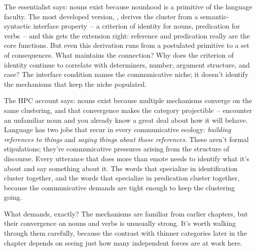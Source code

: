 The essentialist says: nouns exist because nounhood is a primitive of the language faculty. The most developed version, \textcite{baker2003}, derives the cluster from a semantic-syntactic interface property~-- a criterion of identity for nouns, predication for verbs~-- and this gets the extension right: reference and predication really are the core functions. But even this derivation runs from a postulated primitive to a set of consequences. What maintains the connection? Why does the criterion of identity continue to correlate with determiners, number, argument structure, and case? The interface condition names the communicative niche; it doesn't identify the mechanisms that keep the niche populated.

The HPC account says: nouns exist because multiple mechanisms converge on the same clustering, and that convergence makes the category projectible~-- encounter an unfamiliar noun and you already know a great deal about how it will behave. Language has two jobs that recur in every communicative ecology: \emph{building references to things} and \emph{saying things about those references}. These aren't formal stipulations; they're communicative pressures arising from the structure of discourse. Every utterance that does more than emote needs to identify what it's about and say something about it. The words that specialize in identification cluster together, and the words that specialize in predication cluster together, because the communicative demands are tight enough to keep the clustering going.

What demands, exactly? The mechanisms are familiar from earlier chapters, but their convergence on nouns and verbs is unusually strong. It's worth walking through them carefully, because the contrast with thinner categories later in the chapter depends on seeing just how many independent forces are at work here.

